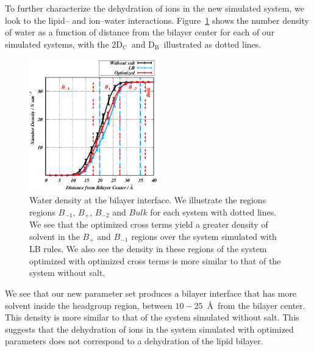 \documentclass[12pt,openany,final]{book}
\newcommand{\db}{$\text{D}_\text{B}$}
\newcommand{\dc}{$\text{2D}_\text{C}$}
\begin{document}
To further characterize the dehydration of ions in the new simulated system, 
we look to the lipid-- and ion--water interactions.
Figure~\ref{fig:waterdens} shows the number density of water as a
function of distance from the bilayer center for each of our simulated
systems, with the \dc~and \db~illustrated as dotted lines.  
\begin{figure}[h!]
    \caption[Water density at the bilayer interface]{
    Water density at the bilayer interface. We illustrate the regions regions $B_{-1}$, $B_+$, $B_{-2}$ and $Bulk$ for each system with dotted lines.
    We see that the optimized cross terms yield a greater density 
    of solvent in the $B_{+}$ and $B_{-1}$ regions over the system simulated with LB rules. 
We also see the density in these regions of the system optimized
with optimized cross terms is more similar to that of the system without salt.}
    \label{fig:waterdens}
    \includegraphics[width=0.5\textwidth,trim=-0cm 0 0 0]{figure_6_ch1.eps}
\end{figure}
We see that our new parameter set produces a bilayer
interface that has more solvent inside the headgroup region, 
between $10-25$~\AA~from the bilayer center. 
This density is more similar to that of the system simulated without salt. 
This suggests that the dehydration of ions in the system simulated with optimized parameters
does not correspond to a dehydration of the lipid bilayer.
\end{document}
